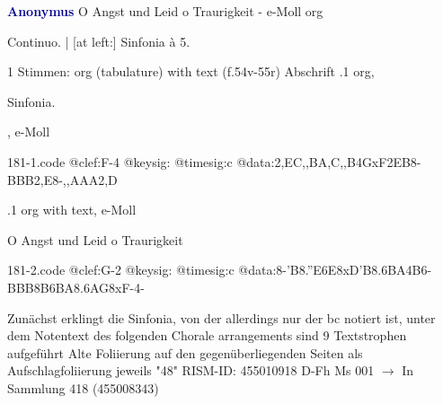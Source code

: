 \documentclass[twocolumn]{book}
\begin{document}
\newline \par \vspace{7pt} \textcolor{darkblue}{\textbf{Anonymus  }}
\newline O Angst und Leid o Traurigkeit - e-Moll
\newline org
\newline \begin{itshape}[f.54v, heading:] Continuo. | [at left:] Sinfonia à 5.\end{itshape} 
\newline \textcolor{darkblue}{}  1 Stimmen: org (tabulature) with text  (f.54v-55r)
\newline Abschrift
.1  org, \begin{itshape}Sinfonia.\end{itshape}, e-Moll  
\begin{filecontents*}{181-1.code}
@clef:F-4
@keysig:
@timesig:c
@data:2,EC,,BA,C,,B4GxF2EB8-{BBB}2,E8-{,,AAA}2,D
\end{filecontents*}
\newline
%
.1  org with text, e-Moll
\newline \begin{footnotesize} O Angst und Leid o Traurigkeit \end{footnotesize}  
\begin{filecontents*}{181-2.code}
@clef:G-2
@keysig:
@timesig:c
@data:8-{'B8.''E6E}{8xD'B8.6BA}4B6-{BBB}{8B6BA8.6AG}8xF-4-
\end{filecontents*}
\newline
%
\newline Zunächst erklingt die Sinfonia, von der allerdings nur der bc notiert ist, unter dem Notentext des folgenden Chorale arrangements sind 9 Textstrophen aufgeführt
\newline Alte Foliierung auf den gegenüberliegenden Seiten als Aufschlagfoliierung jeweils "48"
\newline RISM-ID: 455010918
\newline D-Fh  Ms 001
\newline $\rightarrow$ In Sammlung 418 (455008343)
      
\end{document}
